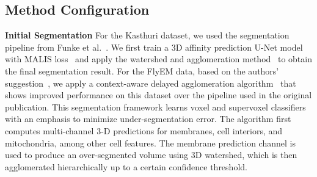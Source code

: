 
\subsection{Method Configuration}
\noindent\textbf{Initial Segmentation}
For the Kasthuri dataset, we used the segmentation pipeline from Funke et al.~\cite{funke2017deep}. 
We first train a 3D affinity prediction U-Net model~\cite{ronneberger2015u} with MALIS loss~\cite{Turaga:2009} and apply the watershed and agglomeration method~\cite{funke2017deep} to obtain the final segmentation result.
For the FlyEM data, based on the authors' suggestion~\cite{takemura2017connectome}, we apply a context-aware delayed agglomeration algorithm~\cite{10.1371/journal.pone.0125825} that shows improved performance on this dataset over the pipeline used in the original publication. 
This segmentation framework learns voxel and supervoxel classifiers with an emphasis to minimize under-segmentation error. 
The algorithm first computes multi-channel 3-D predictions for membranes, cell interiors, and mitochondria, among other cell features. 
The membrane prediction channel is used to produce an over-segmented volume using 3D watershed, which is then agglomerated hierarchically up to a certain confidence threshold. 
